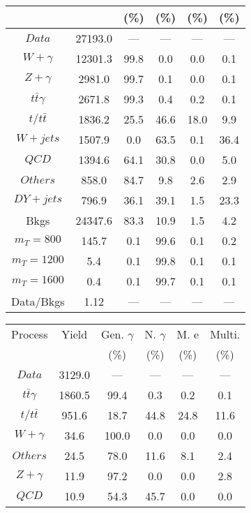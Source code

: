 \begin{figure}
\begin{minipage}[c]{0.32\textwidth}
{\begin{tabular}{cccccc}
 &  & (\%) & (\%) & (\%) & (\%)  \\
\hline
                                                                      $ Data $ &  27193.0 &  --- &  --- &  --- &  ---\\
$ W+\gamma $ &  12301.3 &  99.8 &  0.0 &  0.0 &  0.1\\
$ Z+\gamma $ &  2981.0 &  99.7 &  0.1 &  0.0 &  0.1\\
$ t\bar{t}\gamma $ &  2671.8 &  99.3 &  0.4 &  0.2 &  0.1\\
$ t/t\bar{t} $ &  1836.2 &  25.5 &  46.6 &  18.0 &  9.9\\
$ W+jets $ &  1507.9 &  0.0 &  63.5 &  0.1 &  36.4\\
$ QCD $ &  1394.6 &  64.1 &  30.8 &  0.0 &  5.0\\
$ Others $ &  858.0 &  84.7 &  9.8 &  2.6 &  2.9\\
$ DY+jets $ &  796.9 &  36.1 &  39.1 &  1.5 &  23.3\\
Bkgs &  24347.6 &  83.3 &  10.9 &  1.5 &  4.2\\
$ m_{T} = 800 $ &  145.7 &  0.1 &  99.6 &  0.1 &  0.2\\
$ m_{T} = 1200 $ &  5.4 &  0.1 &  99.8 &  0.1 &  0.1\\
$ m_{T} = 1600 $ &  0.4 &  0.1 &  99.7 &  0.1 &  0.1\\
Data/Bkgs &  1.12 &  --- &  --- &  --- &  ---\\
\hline
\end{tabular}
}
\end{minipage}
\begin{minipage}[c]{0.32\textwidth}
\centering
\tiny{
\begin{tabular}{cccccc}
\hline
Process & Yield & Gen. $\gamma$ & N. $\gamma$ & M. e & Multi. \\
 &  & (\%) & (\%) & (\%) & (\%)  \\
\hline
                                                                      $ Data $ &  3129.0 &  --- &  --- &  --- &  ---\\
$ t\bar{t}\gamma $ &  1860.5 &  99.4 &  0.3 &  0.2 &  0.1\\
$ t/t\bar{t} $ &  951.6 &  18.7 &  44.8 &  24.8 &  11.6\\
$ W+\gamma $ &  34.6 &  100.0 &  0.0 &  0.0 &  0.0\\
$ Others $ &  24.5 &  78.0 &  11.6 &  8.1 &  2.4\\
$ Z+\gamma $ &  11.9 &  97.2 &  0.0 &  0.0 &  2.8\\
$ QCD $ &  10.9 &  54.3 &  45.7 &  0.0 &  0.0\\

\end{tabular}}
\end{minipage}
\end{figure}
